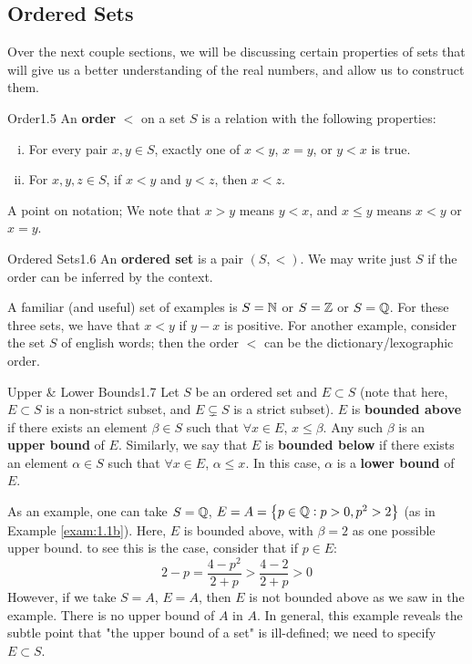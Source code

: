 \subsection{Ordered Sets}
Over the next couple sections, we will be discussing certain properties of sets that will give us a better understanding of the real numbers, and allow us to construct them.

\setcounter{rudin}{4}

\begin{definition}{Order}{1.5}
    An \textbf{order} $<$ on a set $S$ is a relation with the following properties:
    \begin{enumerate}[(i)]
        \item For every pair $x, y \in S$, exactly one of $x < y$, $x = y$, or $y < x$ is true. 
        \item For $x, y, z \in S$, if $x < y$ and $y < z$, then $x < z$. 
    \end{enumerate}
    A point on notation; We note that $x > y$ means $y < x$, and $x \leq y$ means $x < y$ or $x = y$. 
\end{definition}

\begin{definition}{Ordered Sets}{1.6}
    An \textbf{ordered set} is a pair $(S, <)$. We may write just $S$ if the order can be inferred by the context.
\end{definition}
\noindent A familiar (and useful) set of examples is $S = \mathbb{N}$ or $S = \mathbb{Z}$ or $S = \mathbb{Q}$. For these three sets, we have that $x < y$ if $y-x$ is positive. For another example, consider the set $S$ of english words; then the order $<$ can be the dictionary/lexographic order. 

\begin{definition}{Upper \& Lower Bounds}{1.7}
    Let $S$ be an ordered set and $E \subset S$ (note that here, $E \subset S$ is a non-strict subset, and $E \subsetneq S$ is a strict subset). $E$ is \textbf{bounded above} if there exists an element $\beta \in S$ such that $\forall x \in E$, $x \leq \beta$. Any such $\beta$ is an \textbf{upper bound} of $E$. Similarly, we say that $E$ is \textbf{bounded below} if there exists an element $\alpha \in S$ such that $\forall x \in E$, $\alpha \leq x$. In this case, $\alpha$ is a \textbf{lower bound} of $E$.
\end{definition}
\noindent As an example, one can take $S = \mathbb{Q}$, $E = A = \set{p \in \mathbb{Q}: p > 0, p^2 > 2}$ (as in Example \ref{exam:1.1b}). Here, $E$ is bounded above, with $\beta = 2$ as one possible upper bound. to see this is the case, consider that if $p \in E$:
\[2 - p = \frac{4 - p^2}{2+p} > \frac{4-2}{2+p} > 0\]
\noindent However, if we take $S = A$, $E = A$, then $E$ is not bounded above as we saw in the example. There is no upper bound of $A$ in $A$. In general, this example reveals the subtle point that "the upper bound of a set" is ill-defined; we need to specify $E \subset S$. 

